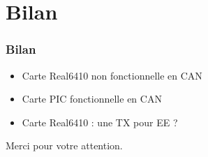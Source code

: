 \documentclass{beamer}
\begin{document}
\section{Bilan}
\begin{frame}
\frametitle{Bilan}
\begin{itemize}
  \item Carte Real6410 non fonctionnelle en CAN
  \item Carte PIC fonctionnelle en CAN
  \item Carte Real6410 : une TX pour EE ?
\end{itemize}
\end{frame}
\begin{frame}
\begin{center}
Merci pour votre attention.
\end{center}
\end{frame}
\end{document}
